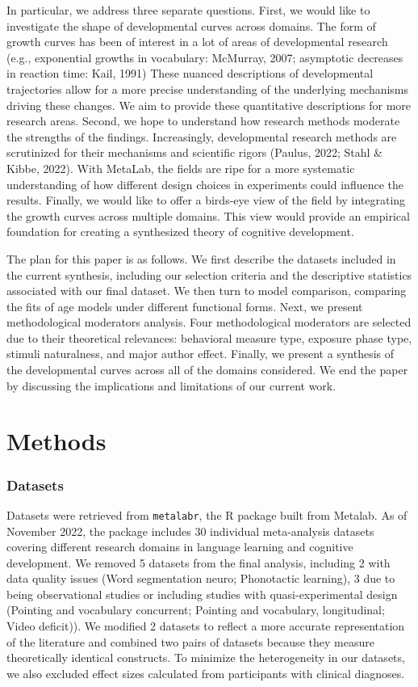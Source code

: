 \documentclass[10pt, letterpaper]{article}
\begin{document}
In particular, we address three separate questions. First, we would like
to investigate the shape of developmental curves across domains. The
form of growth curves has been of interest in a lot of areas of
developmental research (e.g., exponential growths in vocabulary:
McMurray, 2007; asymptotic decreases in reaction time: Kail, 1991) These
nuanced descriptions of developmental trajectories allow for a more
precise understanding of the underlying mechanisms driving these
changes. We aim to provide these quantitative descriptions for more
research areas. Second, we hope to understand how research methods
moderate the strengths of the findings. Increasingly, developmental
research methods are scrutinized for their mechanisms and scientific
rigors (Paulus, 2022; Stahl \& Kibbe, 2022). With MetaLab, the fields
are ripe for a more systematic understanding of how different design
choices in experiments could influence the results. Finally, we would
like to offer a birds-eye view of the field by integrating the growth
curves across multiple domains. This view would provide an empirical
foundation for creating a synthesized theory of cognitive development.

The plan for this paper is as follows. We first describe the datasets
included in the current synthesis, including our selection criteria and
the descriptive statistics associated with our final dataset. We then
turn to model comparison, comparing the fits of age models under
different functional forms. Next, we present methodological moderators
analysis. Four methodological moderators are selected due to their
theoretical relevances: behavioral measure type, exposure phase type,
stimuli naturalness, and major author effect. Finally, we present a
synthesis of the developmental curves across all of the domains
considered. We end the paper by discussing the implications and
limitations of our current work.

\hypertarget{methods}{%
\section{Methods}\label{methods}}

\hypertarget{datasets}{%
\subsubsection{Datasets}\label{datasets}}

Datasets were retrieved from \texttt{metalabr}, the R package built from
Metalab. As of November 2022, the package includes 30 individual
meta-analysis datasets covering different research domains in language
learning and cognitive development. We removed 5 datasets from the final
analysis, including 2 with data quality issues (Word segmentation neuro;
Phonotactic learning), 3 due to being observational studies or including
studies with quasi-experimental design (Pointing and vocabulary
concurrent; Pointing and vocabulary, longitudinal; Video deficit)). We
modified 2 datasets to reflect a more accurate representation of the
literature and combined two pairs of datasets because they measure
theoretically identical constructs. To minimize the heterogeneity in our
datasets, we also excluded effect sizes calculated from participants
with clinical diagnoses.
\end{document}
